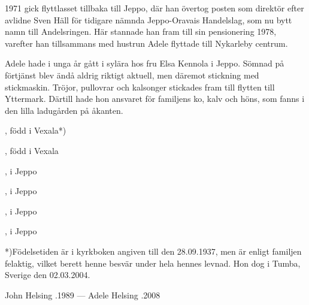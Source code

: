 1971 gick flyttlasset tillbaka till Jeppo, där han övertog posten som	direktör efter avlidne Sven Häll för tidigare nämnda Jeppo-Oravais	Handelslag, som nu bytt namn till Andelsringen. Här stannade han	fram till sin pensionering 1978, varefter han tillsammans med hustrun Adele flyttade till Nykarleby centrum.

Adele hade i unga år gått i sylära hos fru Elsa Kennola i Jeppo.	Sömnad på förtjänst blev ändå aldrig riktigt aktuell, men däremot	stickning med stickmaskin. Tröjor, pullovrar och kalsonger stickades fram till flytten till Yttermark. Därtill hade hon ansvaret för familjens ko, kalv och höns, som fanns i den lilla ladugården på åkanten.
\begin{jhchildren}
  \item {}, född i Vexala*)
  \item {}, född i Vexala
  \item {}, i Jeppo
  \item {}, i Jeppo
  \item {}, i Jeppo
  \item {}, i Jeppo
\end{jhchildren}

*)Födelsetiden är i kyrkboken angiven till den 28.09.1937, men är	enligt familjen felaktig, vilket berett henne besvär under hela hennes	levnad. Hon dog i Tumba, Sverige den 02.03.2004.

John Helsing .1989  ---  Adele Helsing .2008
